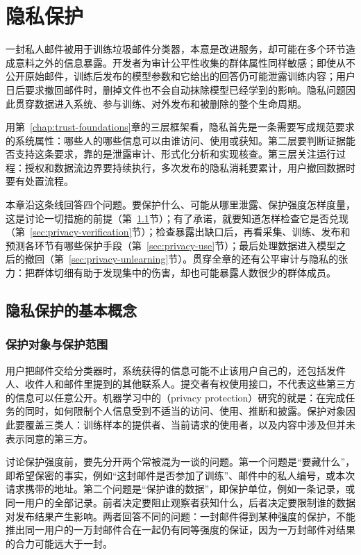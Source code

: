 \chapter{隐私保护}
\label{chap:trust-privacy}

一封私人邮件被用于训练垃圾邮件分类器，本意是改进服务，却可能在多个环节造成意料之外的信息暴露。开发者为审计公平性收集的群体属性同样敏感；即使从不公开原始邮件，训练后发布的模型参数和它给出的回答仍可能泄露训练内容；用户日后要求撤回邮件时，删掉文件也不会自动抹除模型已经学到的影响。隐私问题因此贯穿数据进入系统、参与训练、对外发布和被删除的整个生命周期。

用第~\ref{chap:trust-foundations}章的三层框架看，隐私首先是一条需要写成规范要求的系统属性：哪些人的哪些信息可以由谁访问、使用或获知。第二层要判断证据能否支持这条要求，靠的是泄露审计、形式化分析和实现核查。第三层关注运行过程：授权和数据流边界要持续执行，多次发布的隐私消耗要累计，用户撤回数据时要有处置流程。

本章沿这条线回答四个问题。要保护什么、可能从哪里泄露、保护强度怎样度量，这是讨论一切措施的前提（第~\ref{sec:privacy-concepts}节）；有了承诺，就要知道怎样检查它是否兑现（第~\ref{sec:privacy-verification}节）；检查暴露出缺口后，再看采集、训练、发布和预测各环节有哪些保护手段（第~\ref{sec:privacy-use}节）；最后处理数据进入模型之后的撤回（第~\ref{sec:privacy-unlearning}节）。贯穿全章的还有公平审计与隐私的张力：把群体切细有助于发现集中的伤害，却也可能暴露人数很少的群体成员。

\section{隐私保护的基本概念}
\label{sec:privacy-concepts}

\subsection{保护对象与保护范围}
\label{sec:privacy-subjects}

用户把邮件交给分类器时，系统获得的信息可能不止该用户自己的，还包括发件人、收件人和邮件里提到的其他联系人。提交者有权使用接口，不代表这些第三方的信息可以任意公开。机器学习中的（privacy protection）研究的就是：在完成任务的同时，如何限制个人信息受到不适当的访问、使用、推断和披露。保护对象因此要覆盖三类人：训练样本的提供者、当前请求的使用者，以及内容中涉及但并未表示同意的第三方。

讨论保护强度前，要先分开两个常被混为一谈的问题。第一个问题是“要藏什么”，即希望保密的事实，例如“这封邮件是否参加了训练”、邮件中的私人编号，或本次请求携带的地址。第二个问题是“保护谁的数据”，即保护单位，例如一条记录，或同一用户的全部记录。前者决定要阻止观察者获知什么，后者决定要限制谁的数据对发布结果产生影响。两者回答不同的问题：一封邮件得到某种强度的保护，不能推出同一用户的一万封邮件合在一起仍有同等强度的保证，因为一万封邮件对结果的合力可能远大于一封。


